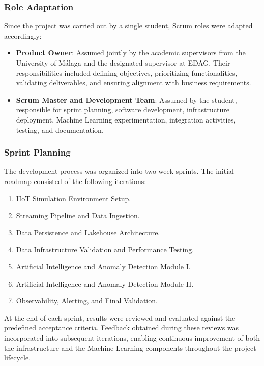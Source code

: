 \subsubsection{Role Adaptation}

Since the project was carried out by a single student, Scrum roles were adapted accordingly:
\begin{itemize}
    \item \textbf{Product Owner}: Assumed jointly by the academic supervisors from the University of Málaga and the designated supervisor at EDAG. Their responsibilities included defining objectives, prioritizing functionalities, validating deliverables, and ensuring alignment with business requirements.
    \item \textbf{Scrum Master and Development Team}: Assumed by the student, responsible for sprint planning, software development, infrastructure deployment, Machine Learning experimentation, integration activities, testing, and documentation.
\end{itemize}

\subsubsection{Sprint Planning}

The development process was organized into two-week sprints. The initial roadmap consisted of the following iterations:
\begin{enumerate}
    \item IIoT Simulation Environment Setup.
    \item Streaming Pipeline and Data Ingestion.
    \item Data Persistence and Lakehouse Architecture.
    \item Data Infrastructure Validation and Performance Testing.
    \item Artificial Intelligence and Anomaly Detection Module I.
    \item Artificial Intelligence and Anomaly Detection Module II.
    \item Observability, Alerting, and Final Validation.
\end{enumerate}
At the end of each sprint, results were reviewed and evaluated against the predefined acceptance criteria. Feedback obtained during these reviews was incorporated into subsequent iterations, enabling continuous improvement of both the infrastructure and the Machine Learning components throughout the project lifecycle.
